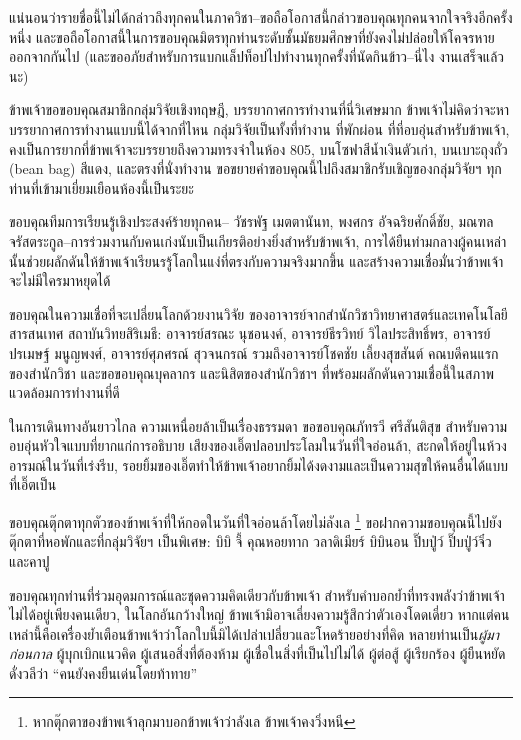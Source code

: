 แน่นอนว่ารายชื่อนี้ไม่ได้กล่าวถึงทุกคนในภาควิชา--ขอถือโอกาสนี้กล่าวขอบคุณทุกคนจากใจจริงอีกครั้งหนึ่ง และขอถือโอกาสนี้ในการขอบคุณมิตรทุกท่านระดับชั้นมัธยมศึกษาที่ยังคงไม่ปล่อยให้โคจรหายออกจากกันไป (และขออภัยสำหรับการแบกแล็ปท็อปไปทำงานทุกครั้งที่นัดกินข้าว--นี่ไง งานเสร็จแล้วนะ)

ข้าพเจ้าขอขอบคุณสมาชิกกลุ่มวิจัยเชิงทฤษฎี, บรรยากาศการทำงานที่นี่วิเศษมาก ข้าพเจ้าไม่คิดว่าจะหาบรรยากาศการทำงานแบบนี้ได้จากที่ไหน กลุ่มวิจัยเป็นทั้งที่ทำงาน ที่พักผ่อน ที่ที่อบอุ่นสำหรับข้าพเจ้า, คงเป็นการยากที่ข้าพเจ้าจะบรรยายถึงความทรงจำในห้อง 805, บนโซฟาสีน้ำเงินตัวเก่า, บนเบาะถุงถั่ว (bean bag) สีแดง, และตรงที่นั่งทำงาน ขอขยายคำขอบคุณนี้ไปถึงสมาชิกรับเชิญของกลุ่มวิจัยฯ ทุกท่านที่เข้ามาเยี่ยมเยือนห้องนี้เป็นระยะ

ขอบคุณทีมการเรียนรู้เชิงประสงค์ร้ายทุกคน--
วัชรพัฐ เมตตานันท, พงศกร อัจฉริยศักดิ์ชัย, มณฑล จรัสตระกูล--การร่วมงานกับคนเก่งนับเป็นเกียรติอย่างยิ่งสำหรับข้าพเจ้า, การได้ยืนท่ามกลางผู้คนเหล่านั้นช่วยผลักดันให้ข้าพเจ้าเรียนรรู้โลกในแง่ที่ตรงกับความจริงมากขึ้น และสร้างความเชื่อมั่นว่าข้าพเจ้าจะไม่มีใครมาหยุดได้

ขอบคุณในความเชื่อที่จะเปลี่ยนโลกด้วยงานวิจัย ของอาจารย์จากสำนักวิชาวิทยาศาสตร์และเทคโนโลยีสารสนเทศ สถาบันวิทยสิริเมธี: อาจารย์สรณะ นุชอนงค์, อาจารย์ธีรวิทย์ วิไลประสิทธิ์พร, อาจารย์ปรเมษฐ์ มนูญพงศ์, อาจารย์ศุภศรณ์ สุวจนกรณ์ รวมถึงอาจารย์โชคชัย เลี้ยงสุขสันต์ คณบดีคนแรกของสำนักวิชา และขอขอบคุณบุคลากร และนิสิตของสำนักวิชาฯ ที่พร้อมผลักดันความเชื่อนี้ในสภาพแวดล้อมการทำงานที่ดี

ในการเดินทางอันยาวไกล ความเหนื่อยล้าเป็นเรื่องธรรมดา ขอขอบคุณภัทรวี ศรีสันติสุข สำหรับความอบอุ่นหัวใจแบบที่ยากแก่การอธิบาย เสียงของเอิ๊ตปลอบประโลมในวันที่ใจอ่อนล้า, สะกดให้อยู่ในห้วงอารมณ์ในวันที่เร่งรีบ, รอยยิ้มของเอิ๊ตทำให้ข้าพเจ้าอยากยิ้มได้งดงามและเป็นความสุขให้คนอื่นได้แบบที่เอิ๊ตเป็น

ขอบคุณตุ๊กตาทุกตัวของข้าพเจ้าที่ให้กอดในวันที่ใจอ่อนล้าโดยไม่ลังเล \footnote{หากตุ๊กตาของข้าพเจ้าลุกมาบอกข้าพเจ้าว่าลังเล ข้าพเจ้าคงวิ่งหนี} ขอฝากความขอบคุณนี้ไปยังตุ๊กตาที่หอพักและที่กลุ่มวิจัยฯ เป็นพิเศษ: บิบิ จี้ คุณหอยทาก วลาดิเมียร์ บิบินอน ปิ๊บปู่ว์ ปิ๊บปู่ว์จิ๋ว และคาปู

ขอบคุณทุกท่านที่ร่วมอุดมการณ์และชุดความคิดเดียวกับข้าพเจ้า สำหรับคำบอกย้ำที่ทรงพลังว่าข้าพเจ้าไม่ได้อยู่เพียงคนเดียว, ในโลกอันกว้างใหญ่ ข้าพเจ้ามิอาจเลี่ยงความรู้สึกว่าตัวเองโดดเดี่ยว หากแต่คนเหล่านี้คือเครื่องย้ำเตือนข้าพเจ้าว่าโลกใบนี้มิได้เปล่าเปลี่ยวและโหดร้ายอย่างที่คิด หลายท่านเป็น\textit{ผู้มาก่อนกาล} ผู้บุกเบิกแนวคิด ผู้เสนอสิ่งที่ต้องห้าม ผู้เชื่อในสิ่งที่เป็นไปไม่ได้ ผู้ต่อสู้ ผู้เรียกร้อง ผู้ยืนหยัด ดั่งวลีว่า ``คนยังคงยืนเด่นโดยท้าทาย''

